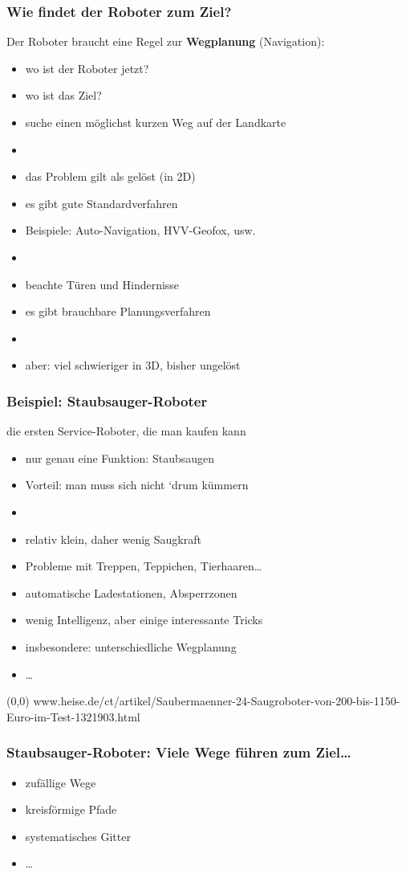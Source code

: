 \documentclass[t]{beamer}
\def\quelle#1{{\tiny \makebox(0,0){}\vfill\hfill #1}}
\def\ii{\item[]}
\begin{document}
\begin{frame}
\frametitle{Wie findet der Roboter zum Ziel?}
Der Roboter braucht eine Regel zur \textbf{Wegplanung} (Navigation):
\begin{itemize}
\item wo ist der Roboter jetzt?
\item wo ist das Ziel?
\item suche einen möglichst kurzen Weg auf der Landkarte
\ii
\item das Problem gilt als gelöst (in 2D)
\item es gibt gute Standardverfahren
\item Beispiele: Auto-Navigation, HVV-Geofox, usw.
\ii
\item beachte Türen und Hindernisse
\item es gibt brauchbare Planungsverfahren
\ii 
\item aber: viel schwieriger in 3D, bisher ungelöst
\end{itemize}
\end{frame}


\begin{frame}
\frametitle{Beispiel: Staubsauger-Roboter}
%
die ersten Service-Roboter, die man kaufen kann
\begin{itemize}
\item nur genau eine Funktion: Staubsaugen
\item Vorteil: man muss sich nicht `drum kümmern
\ii
\item relativ klein, daher wenig Saugkraft
\item Probleme mit Treppen, Teppichen, Tierhaaren\dots
\item automatische Ladestationen, Absperrzonen
\item wenig Intelligenz, aber einige interessante Tricks
\item insbesondere: unterschiedliche Wegplanung
\item \dots
\end{itemize}
\quelle{%
www.heise.de/ct/artikel/Saubermaenner-24-Saugroboter-von-200-bis-1150-Euro-im-Test-1321903.html}
\end{frame}


\begin{frame}
\frametitle{Staubsauger-Roboter: Viele Wege führen zum Ziel\dots}
%
%
%
\vspace*{-5mm}
\begin{itemize}
\item zufällige Wege
\item kreisförmige Pfade
\item systematisches Gitter
\item \dots
\end{itemize}
\end{frame}
\end{document}
